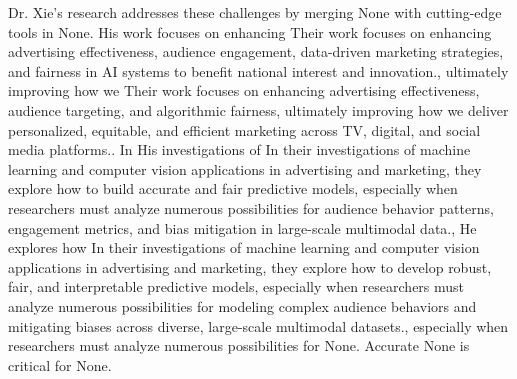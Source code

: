 \documentclass{article}
\begin{document}
Dr. Xie's research addresses these challenges by merging None with cutting-edge tools in None. His work focuses on enhancing Their work focuses on enhancing advertising effectiveness, audience engagement, data-driven marketing strategies, and fairness in AI systems to benefit national interest and innovation., ultimately improving how we Their work focuses on enhancing advertising effectiveness, audience targeting, and algorithmic fairness, ultimately improving how we deliver personalized, equitable, and efficient marketing across TV, digital, and social media platforms.. In His investigations of In their investigations of machine learning and computer vision applications in advertising and marketing, they explore how to build accurate and fair predictive models, especially when researchers must analyze numerous possibilities for audience behavior patterns, engagement metrics, and bias mitigation in large-scale multimodal data., He explores how In their investigations of machine learning and computer vision applications in advertising and marketing, they explore how to develop robust, fair, and interpretable predictive models, especially when researchers must analyze numerous possibilities for modeling complex audience behaviors and mitigating biases across diverse, large-scale multimodal datasets., especially when researchers must analyze numerous possibilities for None. Accurate None is critical for None.
\end{document}
